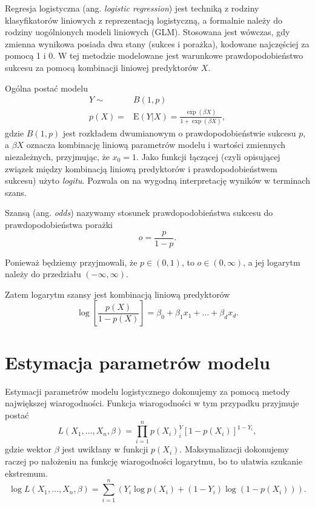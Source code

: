 \documentclass[
]{book}
\newcommand{\E}{\mathrm{E}}
\theoremstyle{plain}
\theoremstyle{definition}
\theoremstyle{definition}
\theoremstyle{definition}
\theoremstyle{definition}
\theoremstyle{remark}
\begin{document}
Regresja logistyczna (ang. \emph{logistic regression}) jest techniką z rodziny klasyfikatorów liniowych z reprezentacją logistyczną, a formalnie należy do rodziny uogólnionych modeli liniowych (GLM). Stosowana jest wówczas, gdy zmienna wynikowa posiada dwa stany (sukces i porażka), kodowane najczęściej za pomocą 1 i 0. W tej metodzie modelowane jest warunkowe prawdopodobieństwo sukcesu za pomocą kombinacji liniowej predyktorów \(X\).

Ogólna postać modelu
\begin{align}
    Y\sim &B(1, p)\\
    p(X)=&\E(Y|X)=\frac{\exp(\beta X)}{1+\exp(\beta X)},
\end{align}
gdzie \(B(1,p)\) jest rozkładem dwumianowym o prawdopodobieństwie sukcesu \(p\), a \(\beta X\) oznacza kombinację liniową parametrów modelu i wartości zmiennych niezależnych, przyjmując, że \(x_0=1\). Jako funkcji łączącej (czyli opisującej związek między kombinacją liniową predyktorów i prawdopodobieństwem sukcesu) użyto \emph{logitu}. Pozwala on na wygodną interpretację wyników w terminach szans.

Szansą (ang. \emph{odds}) nazywamy stosunek prawdopodobieństwa sukcesu do prawdopodobieństwa porażki
\begin{equation}
    o = \frac{p}{1-p}.
\end{equation}

Ponieważ będziemy przyjmowali, że \(p\in (0,1)\), to \(o\in (0,\infty)\), a jej logarytm należy do przedziału \((-\infty, \infty)\).

Zatem logarytm szansy jest kombinacją liniową predyktorów
\begin{equation}
    \log\left[\frac{p(X)}{1-p(X)}\right]=\beta_0+\beta_1x_1+\ldots+\beta_dx_d.
\end{equation}

\hypertarget{estymacja-parametruxf3w-modelu}{%
\section{Estymacja parametrów modelu}\label{estymacja-parametruxf3w-modelu}}

Estymacji parametrów modelu logistycznego dokonujemy za pomocą metody największej wiarogodności. Funkcja wiarogodności w tym przypadku przyjmuje postać
\begin{equation}
    L(X_1,\ldots,X_n,\beta)=\prod_{i=1}^{n}p(X_i)^Y_i[1-p(X_i)]^{1-Y_i},
\end{equation}
gdzie wektor \(\beta\) jest uwikłany w funkcji \(p(X_i)\). Maksymalizacji dokonujemy raczej po nałożeniu na funkcję wiarogodności logarytmu, bo to ułatwia szukanie ekstremum.
\begin{equation}
    \log L(X_1,\ldots,X_n,\beta) = \sum_{i=1}^n(Y_i\log p(X_i)+(1-Y_i)\log(1-p(X_i))).
\end{equation}
\end{document}
